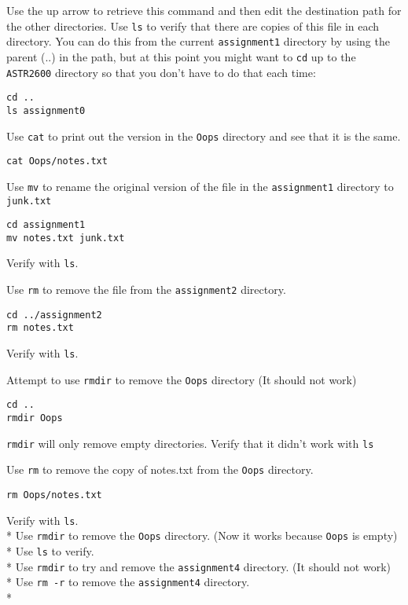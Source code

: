 \documentclass{article}
\begin{document}
\begin{spacing}{1.0}
Use the up arrow to retrieve this command and then edit the destination path for the other directories.
Use \verb|ls| to verify that there are copies of this file in each directory.
You can do this from the current \verb|assignment1| directory by using the parent (..) in the path,  but at this point you might want to \verb|cd| up to the \verb|ASTR2600| directory so that you don’t have to do that each time:

\begin{verbatim}
cd ..
ls assignment0
\end{verbatim}

Use \verb|cat| to print out the version in the \verb|Oops| directory and see that it is the same.

\verb|cat Oops/notes.txt|

Use \verb|mv| to rename the original version of the file in the \verb|assignment1| directory to \verb|junk.txt|

\begin{verbatim}
cd assignment1
mv notes.txt junk.txt
\end{verbatim}

Verify with \verb|ls|.

Use \verb|rm| to remove the file from the \verb|assignment2| directory.  

\begin{verbatim}
cd ../assignment2
rm notes.txt
\end{verbatim}

Verify with \verb|ls|.

Attempt to use \verb|rmdir| to remove the \verb|Oops| directory  (It should not work)

\begin{verbatim}
cd ..
rmdir Oops
\end{verbatim}

\verb|rmdir| will only remove empty directories.  Verify that it didn’t work with \verb|ls| 

Use \verb|rm| to remove the copy of notes.txt from the \verb|Oops| directory.  

\verb|rm Oops/notes.txt|

\begin{tabbing}
Verify with \verb|ls|. \\*
Use \verb|rmdir| to remove the \verb|Oops| directory.  (Now it works because \verb|Oops| is empty) \\*
Use \verb|ls| to verify. \\*
Use \verb|rmdir| to try and remove the \verb|assignment4| directory.  (It should not work) \\*
Use \verb|rm -r| to remove the \verb|assignment4| directory. \\*
\end{tabbing}


\end{spacing}
\end{document}
